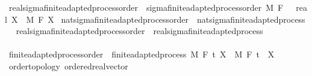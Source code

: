 \begin{isabellebody}
\isamarkupfalse%
\ real{\isacharunderscore}{\kern0pt}sigma{\isacharunderscore}{\kern0pt}finite{\isacharunderscore}{\kern0pt}adapted{\isacharunderscore}{\kern0pt}process{\isacharunderscore}{\kern0pt}order\ {\isacharequal}{\kern0pt}\ sigma{\isacharunderscore}{\kern0pt}finite{\isacharunderscore}{\kern0pt}adapted{\isacharunderscore}{\kern0pt}process{\isacharunderscore}{\kern0pt}order\ M\ F\ {\isachardoublequoteopen}{}\ {\isacharcolon}{\kern0pt}{\isacharcolon}{\kern0pt}\ real{\isachardoublequoteclose}\ X\ \ M\ F\ X\isanewline
\isanewline
{}\isamarkupfalse%
\ nat{\isacharunderscore}{\kern0pt}sigma{\isacharunderscore}{\kern0pt}finite{\isacharunderscore}{\kern0pt}adapted{\isacharunderscore}{\kern0pt}process{\isacharunderscore}{\kern0pt}order\ {\isasymsubseteq}\ nat{\isacharunderscore}{\kern0pt}sigma{\isacharunderscore}{\kern0pt}finite{\isacharunderscore}{\kern0pt}adapted{\isacharunderscore}{\kern0pt}process%
\isadelimproof
\ %
\endisadelimproof
%
\isatagproof
\isacommand{{\isachardot}{\kern0pt}{\isachardot}{\kern0pt}}\isamarkupfalse%
%
\endisatagproof
{\isafoldproof}%
%
\isadelimproof
%
\endisadelimproof
\isanewline
{}\isamarkupfalse%
\ real{\isacharunderscore}{\kern0pt}sigma{\isacharunderscore}{\kern0pt}finite{\isacharunderscore}{\kern0pt}adapted{\isacharunderscore}{\kern0pt}process{\isacharunderscore}{\kern0pt}order\ {\isasymsubseteq}\ real{\isacharunderscore}{\kern0pt}sigma{\isacharunderscore}{\kern0pt}finite{\isacharunderscore}{\kern0pt}adapted{\isacharunderscore}{\kern0pt}process%
\isadelimproof
\ %
\endisadelimproof
%
\isatagproof
\isacommand{{\isachardot}{\kern0pt}{\isachardot}{\kern0pt}}\isamarkupfalse%
%
\endisatagproof
{\isafoldproof}%
%
\isadelimproof
%
\endisadelimproof
\isanewline
\ \ \ \ \ \ \ \ \ \ \ \ \ \ \ \ \ \ \ \ \ \ \ \ \ \ \ \ \ \ \ \ \ \ \ \ \ \ \ \ \ \ \ \ \ \ \ \ \isanewline
{}\isamarkupfalse%
\ finite{\isacharunderscore}{\kern0pt}adapted{\isacharunderscore}{\kern0pt}process{\isacharunderscore}{\kern0pt}order\ {\isacharequal}{\kern0pt}\ finite{\isacharunderscore}{\kern0pt}adapted{\isacharunderscore}{\kern0pt}process\ M\ F\ t\ X\ \ M\ F\ t\ \ X\ {\isacharcolon}{\kern0pt}{\isacharcolon}{\kern0pt}\ {\isachardoublequoteopen}{\isacharunderscore}{\kern0pt}\ \ {\isasymRightarrow}\ {\isacharunderscore}{\kern0pt}\ {\isasymRightarrow}\ {\isacharunderscore}{\kern0pt}\ {\isacharcolon}{\kern0pt}{\isacharcolon}{\kern0pt}\ {\isacharbraceleft}{\kern0pt}order{\isacharunderscore}{\kern0pt}topology{\isacharcomma}{\kern0pt}\ ordered{\isacharunderscore}{\kern0pt}real{\isacharunderscore}{\kern0pt}vector{\isacharbraceright}{\kern0pt}{\isachardoublequoteclose}\ \isanewline

\end{isabellebody}
